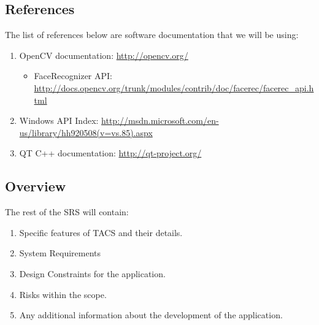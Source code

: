 \documentclass[titlepage]{article}
\begin{document}
\subsection{References}
The list of references below are software documentation that we will be using:
\begin{enumerate}
	\item OpenCV documentation: \href{http://opencv.org/}{\color{blue} http://opencv.org/}
	\begin{itemize}
		\item FaceRecognizer API: \href{http://docs.opencv.org/trunk/modules/contrib/doc/facerec/facerec\_api.html}{\color{blue} http://docs.opencv.org/trunk/modules/contrib/doc/facerec/facerec\_api.html}
	\end{itemize}
	\item Windows API Index: \href{http://msdn.microsoft.com/en-us/library/hh920508(v=vs.85).aspx}{\color{blue} http://msdn.microsoft.com/en-us/library/hh920508(v=vs.85).aspx}
	\item QT C++ documentation: \href{http://qt-project.org/}{\color{blue} http://qt-project.org/}
\end{enumerate}

\subsection{Overview}
The rest of the SRS will contain:
\begin{enumerate}
	\item Specific features of TACS and their details.
	\item System Requirements
	\item Design Constraints for the application.
	\item Risks within the scope.
	\item Any additional information about the development of the application.
\end{enumerate}
\end{document}
